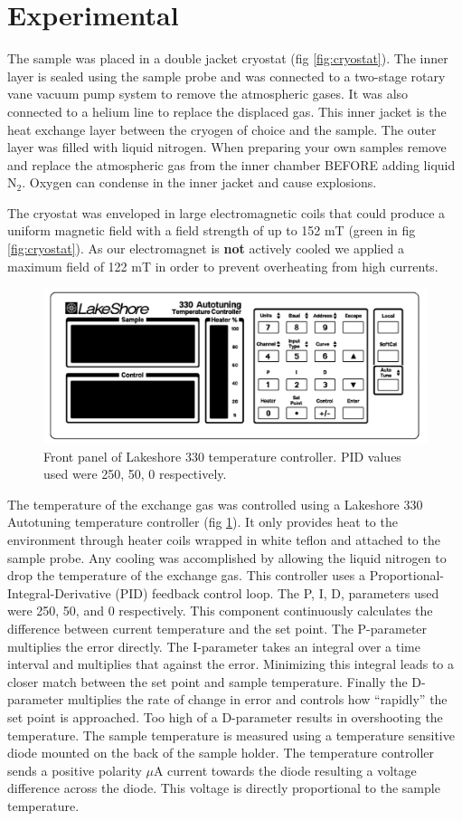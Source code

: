\documentclass[
reprint,
amsmath,amssymb,
aps,
tikz,
border=5pt
]{revtex4-1}
\begin{document}
\section*{Experimental }


    The sample was placed in a double jacket cryostat (fig \ref{fig:cryostat}). The inner layer is sealed using the sample probe and was connected to a  two-stage rotary vane vacuum pump system to remove the atmospheric gases. It was also connected to a helium line to replace the displaced gas. This inner jacket is the heat exchange layer between the cryogen of choice and the sample. The outer layer was filled with liquid nitrogen. When preparing your own samples remove and replace the atmospheric gas from the inner chamber BEFORE adding liquid N$_2$. Oxygen can condense in the inner jacket and cause explosions. 
    
    
    The cryostat was enveloped in large electromagnetic coils that could produce a uniform magnetic field with a field strength of up to 152 mT (green in fig \ref{fig:cryostat}). As our electromagnet is \textbf{not} actively cooled we applied a maximum field of 122 mT in order to prevent overheating from high currents.


    \begin{figure}[b]
      \includegraphics[width=0.5 \textwidth]{figures/lakeshore.png}
      \caption{Front panel of Lakeshore 330 temperature controller. PID values used were 250, 50, 0 respectively.}
      \label{fig:lakeshore}
    \end{figure}

    
    The temperature of the exchange gas was controlled using a Lakeshore 330 Autotuning temperature controller (fig \ref{fig:lakeshore}). It only provides heat to the environment through heater coils wrapped in white teflon and attached to the sample probe. Any cooling was accomplished by allowing the liquid nitrogen to drop the temperature of the exchange gas. This controller uses a Proportional-Integral-Derivative (PID) feedback control loop. The P, I, D, parameters used were 250, 50, and 0 respectively. This component continuously  calculates the difference between current temperature and the set point. The P-parameter multiplies the error directly. The I-parameter takes an integral over a time interval and multiplies that against the error. Minimizing this integral leads to a closer match between the set point and sample temperature. Finally the D-parameter multiplies the rate of change in error and controls how ``rapidly'' the set point is approached. Too high of a D-parameter results in overshooting the temperature. The sample temperature is measured using a temperature sensitive diode mounted on the back of the sample holder. The temperature controller sends a positive polarity $\mu$A current towards the diode resulting a voltage difference across the diode. This voltage is directly proportional to the sample temperature. 
    
\end{document}
